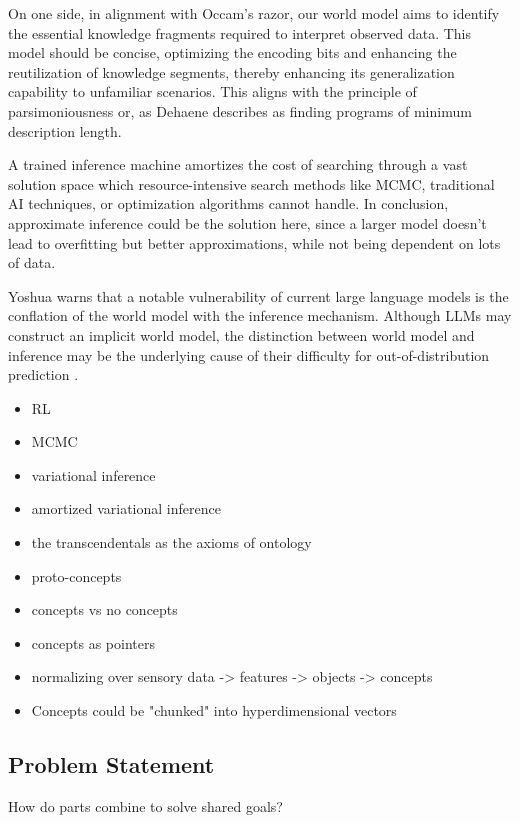On one side, in alignment with Occam's razor, our world model aims to identify the essential knowledge fragments required to interpret observed data. This model should be concise, optimizing the encoding bits and enhancing the reutilization of knowledge segments, thereby enhancing its generalization capability to unfamiliar scenarios. This aligns with the principle of parsimoniousness or, as Dehaene describes as finding programs of minimum description length.

A trained inference machine amortizes the cost of searching through a vast solution space which resource-intensive search methods like MCMC, traditional AI techniques, or optimization algorithms cannot handle.
In conclusion, approximate inference could be the solution here, since a larger model doesn't lead to overfitting but better approximations, while not being dependent on lots of data.

Yoshua warns that a notable vulnerability of current large language models is the conflation of the world model with the inference mechanism. Although LLMs may construct an implicit world model, the distinction between world model and inference may be the underlying cause of their difficulty for out-of-distribution prediction \cite{goyal_inductive_2022, yoshuabengioScalingService}.

\begin{itemize}
    \item RL
    \item MCMC
    \item variational inference
    \item amortized variational inference
\end{itemize}

\begin{itemize}
    \item the transcendentals as the axioms of ontology
    \item proto-concepts
    \item concepts vs no concepts
    \item concepts as pointers
    \item normalizing over sensory data -> features -> objects -> concepts 
    \item Concepts could be "chunked" into hyperdimensional vectors
\end{itemize}

\subsection{Problem Statement}
How do parts combine to solve shared goals?

